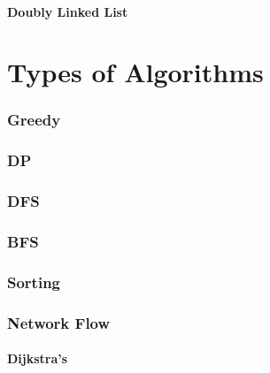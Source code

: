 \documentclass{article}
\begin{document}
        \subsection{Doubly Linked List}
\part{Types of Algorithms}
    \section{Greedy}
    \section{DP}
    \section{DFS}
    \section{BFS}
    \section{Sorting}
    \section{Network Flow}
        \subsection{Dijkstra's}
\end{document}
